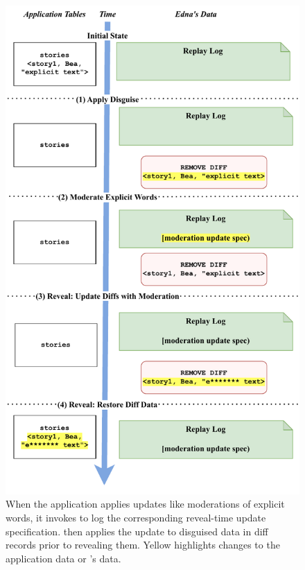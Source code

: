 \begin{figure}
    \centering
    \includegraphics[width=.8\textwidth]{figs/update-moderation}
    \caption[During reveal, \sys applies reveal-time update specifications for
    global moderation updates.]{When the application applies updates like moderations of explicit
    words, it invokes \sys to log the corresponding reveal-time update specification. \sys then applies the
    update to disguised data in diff records prior to revealing them. Yellow 
    highlights changes to the application data or \sys's data.}
\label{f:update:mod}
\end{figure}
    
